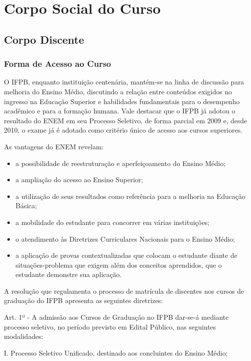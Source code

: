 \newpage
\section{Corpo Social do Curso}

\subsection{Corpo Discente}

\subsubsection{Forma de Acesso ao Curso}

	O IFPB, enquanto instituição centenária, mantém-se na linha de discussão para melhoria do Ensino Médio, discutindo a relação entre conteúdos exigidos no ingresso na Educação Superior e habilidades fundamentais para o desempenho acadêmico e para a formação humana. Vale destacar que o IFPB já adotou o resultado do ENEM em seu Processo Seletivo, de forma parcial em 2009 e, desde 2010, o exame já é adotado como critério único de acesso aos cursos superiores.

As vantagens do ENEM revelam:

\begin{itemize}
\item a possibilidade de reestruturação e aperfeiçoamento do Ensino Médio;
\item a ampliação do acesso ao Ensino Superior;
\item a utilização de seus resultados como referência para a melhoria na Educação Básica;
\item a mobilidade do estudante para concorrer em várias instituições;
\item o atendimento às Diretrizes Curriculares Nacionais para o Ensino Médio;
\item a aplicação de provas contextualizadas que colocam o estudante diante de situações-problema que exigem além dos conceitos aprendidos, que o estudante demonstre sua aplicação.
\end{itemize}

 A resolução que regulamenta o processo de matrícula de discentes nos cursos de graduação do IFPB apresenta as seguintes diretrizes:

Art. 1º - A admissão aos Cursos de Graduação no IFPB dar-se-á mediante processo seletivo, no período previsto em Edital Público, nas seguintes modalidades:


I. Processo Seletivo Unificado, destinado aos concluintes do Ensino Médio;

